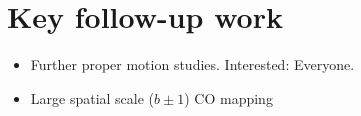 \section{Key follow-up work}
\begin{itemize}
\item Further proper motion studies.  Interested: Everyone.
\item Large spatial scale ($b\pm1$\deg) CO mapping
\end{itemize}